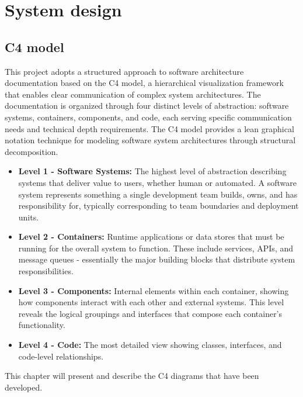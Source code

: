 \section{System design}
\subsection{C4 model} \label{sec:ucdiagram}


This project adopts a structured approach to software architecture documentation based on the C4 model, a hierarchical visualization framework that enables clear communication of complex system architectures. The documentation is organized through four distinct levels of abstraction: software systems, containers, components, and code, each serving specific communication needs and technical depth requirements. The C4 model provides a lean graphical notation technique for modeling software system architectures through structural decomposition.
\begin{itemize}
    \item \textbf{Level 1 - Software Systems:} The highest level of abstraction describing systems that deliver value to users, whether human or automated. A software system represents something a single development team builds, owns, and has responsibility for, typically corresponding to team boundaries and deployment units.

    \item \textbf{Level 2 - Containers:} Runtime applications or data stores that must be running for the overall system to function. These include services, APIs, and message queues - essentially the major building blocks that distribute system responsibilities.

    \item \textbf{Level 3 - Components:} Internal elements within each container, showing how components interact with each other and external systems. This level reveals the logical groupings and interfaces that compose each container's functionality.

    \item \textbf{Level 4 - Code:} The most detailed view showing classes, interfaces, and code-level relationships.

\end{itemize}
This chapter will present and describe the C4 diagrams that have been developed.
